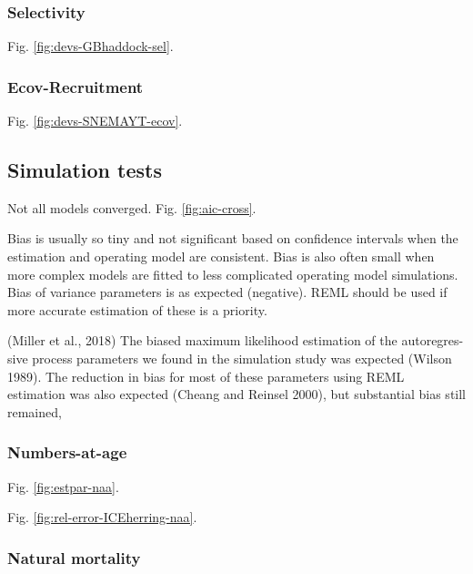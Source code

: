 \documentclass[]{article}
\begin{document}
\hypertarget{selectivity}{%
\subsubsection{Selectivity}\label{selectivity}}

Fig. \ref{fig:devs-GBhaddock-sel}.

\hypertarget{ecov-recruitment}{%
\subsubsection{Ecov-Recruitment}\label{ecov-recruitment}}

Fig. \ref{fig:devs-SNEMAYT-ecov}.

\hypertarget{simulation-tests-1}{%
\subsection{Simulation tests}\label{simulation-tests-1}}

Not all models converged. Fig. \ref{fig:aic-cross}.

Bias is usually so tiny and not significant based on confidence
intervals when the estimation and operating model are consistent. Bias
is also often small when more complex models are fitted to less
complicated operating model simulations. Bias of variance parameters is
as expected (negative). REML should be used if more accurate estimation
of these is a priority.

(Miller et al., 2018) The biased maximum likelihood estimation of the
autoregres- sive process parameters we found in the simulation study was
expected (Wilson 1989). The reduction in bias for most of these
parameters using REML estimation was also expected (Cheang and Reinsel
2000), but substantial bias still remained,

\hypertarget{numbers-at-age-1}{%
\subsubsection{Numbers-at-age}\label{numbers-at-age-1}}

Fig. \ref{fig:estpar-naa}.

Fig. \ref{fig:rel-error-ICEherring-naa}.

\hypertarget{natural-mortality-1}{%
\subsubsection{Natural mortality}\label{natural-mortality-1}}
\end{document}

